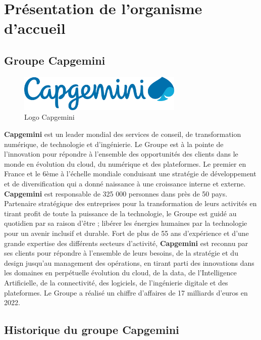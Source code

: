 \documentclass[12pt,a4paper]{report}
\begin{document}
\section{Présentation de l'organisme d'accueil}

\subsection{Groupe Capgemini}

\begin{figure}[htbp]
    \centering
    \includegraphics[width=0.7\textwidth]{latex_media/media/image3.png}
    \caption{Logo Capgemini}
    \label{fig:logo-capgemini}
\end{figure}

\textbf{Capgemini} est un leader mondial des services de conseil, de transformation numérique, de technologie et d'ingénierie. Le Groupe est à la pointe de l'innovation pour répondre à l'ensemble des opportunités des clients dans le monde en évolution du cloud, du numérique et des plateformes. Le premier en France et le 6ème à l'échelle mondiale conduisant une stratégie de développement et de diversification qui a donné naissance à une croissance interne et externe. \textbf{Capgemini} est responsable de
325 000 personnes dans près de 50 pays. Partenaire stratégique des
entreprises pour la transformation de leurs activités en tirant profit
de toute la puissance de la technologie, le Groupe est guidé au
quotidien par sa raison d'être ; libérer les énergies humaines par la
technologie pour un avenir inclusif et durable. Fort de plus de 55 ans
d'expérience et d'une grande expertise des différents secteurs
d'activité, \textbf{Capgemini} est reconnu par ses clients pour répondre
à l'ensemble de leurs besoins, de la stratégie et du design jusqu'au
management des opérations, en tirant parti des innovations dans les
domaines en perpétuelle évolution du cloud, de la data, de
l'Intelligence Artificielle, de la connectivité, des logiciels, de
l'ingénierie digitale et des plateformes. Le Groupe a réalisé un chiffre
d'affaires de 17 milliards d'euros en 2022.

\subsection{Historique du groupe Capgemini}
\end{document}
